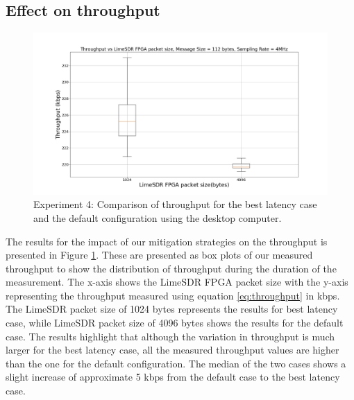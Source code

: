 \subsection{Effect on throughput}

\begin{figure}[h!]
\centering
\includegraphics[width=\textwidth]{Thesis/Figure/throughput.png}
\caption{Experiment 4: Comparison of throughput for the best latency case and the default configuration using the desktop computer.}
\label{e4_throughput}
\end{figure}

The results for the  impact of our mitigation strategies on the throughput is presented in Figure \ref{e4_throughput}.
These are presented as box plots of our measured throughput to show the distribution of throughput during the duration of the measurement.
The x-axis shows the LimeSDR FPGA packet size with the y-axis representing the throughput measured using equation \ref{eq:throughput} in kbps.
The LimeSDR packet size of 1024 bytes represents the results for best latency case, while LimeSDR packet size of 4096 bytes shows the results for the default case.
The results highlight that although the variation in throughput is much larger for the best latency case, all the measured throughput values are higher than the one for the default configuration.
The median of the two cases shows a slight increase of approximate 5 kbps from the default case to the best latency case.\\


